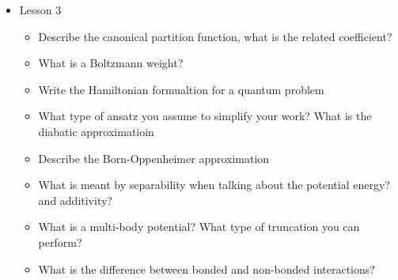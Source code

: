 {\begin{itemize}
\begin{enumerate}
        \item How can you write the average of that quantity?
        \item What is a partition function? what type of coefficient it has?
        \item Formula for entropy in the microcanonical ensamble
    \end{enumerate}
    \item Lesson 3
    \begin{itemize}
        \item Describe the canonical partition function, what is the related coefficient?
        \item What is a Boltzmann weight?
        \item Write the Hamiltonian formualtion for a quantum problem
        \item What type of ansatz you assume to simplify your work? What is the diabatic approximatioin
        \item Describe the Born-Oppenheimer approximation
        \item What is meant by separability when talking about the potential energy? and additivity?
        \item What is a multi-body potential? What type of truncation you can perform?
        \item What is the difference between bonded and non-bonded interactions?
    \end{itemize}    
\end{itemize}
}